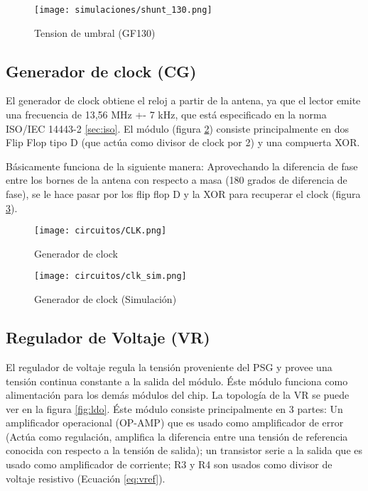 \begin{figure}[H]
\centering
\texttt{[image: simulaciones/shunt\_130.png]}
\caption{Tension de umbral (GF130)}
\label{fig:shunt_130}
\end{figure}


\subsection{Generador de clock (CG)}

El generador de clock obtiene el reloj a partir de la antena, ya que el lector emite una frecuencia de 13,56 MHz +- 7 kHz, que está especificado en la norma ISO/IEC 14443-2 \ref{sec:iso}. El módulo (figura \ref{fig:clock_gen}) consiste principalmente en dos Flip Flop tipo D (que actúa como divisor de clock por 2) y una compuerta XOR.

Básicamente funciona de la siguiente manera: Aprovechando la diferencia de fase entre los bornes de la antena con respecto a masa (180 grados de diferencia de fase), se le hace pasar por los flip flop D y la XOR para recuperar el clock (figura \ref{fig:clock_gen_sim}).

\begin{figure}[H]
\centering
\texttt{[image: circuitos/CLK.png]}
\caption{Generador de clock}
\label{fig:clock_gen}
\end{figure}

\begin{figure}[H]
\centering
\texttt{[image: circuitos/clk\_sim.png]}
\caption{Generador de clock (Simulación)}
\label{fig:clock_gen_sim}
\end{figure}

\subsection{Regulador de Voltaje (VR)}

El regulador de voltaje regula la tensión proveniente del PSG y provee una tensión continua constante a la salida del módulo. Éste módulo funciona como alimentación para los demás módulos del chip. La topología de la VR se puede ver en la figura \ref{fig:ldo}. Éste módulo consiste principalmente en 3 partes: Un amplificador operacional (OP-AMP) que es usado como amplificador de error (Actúa como regulación, amplifica la diferencia entre una tensión de referencia conocida con respecto a la tensión de salida); un transistor serie a la salida que es usado como amplificador de corriente; R3 y R4 son usados como divisor de voltaje resistivo (Ecuación \ref{eq:vref}).  

